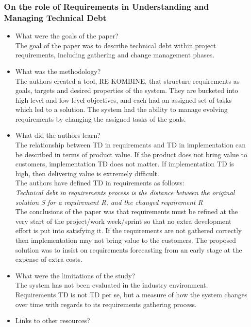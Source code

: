 \documentclass{mprop}
\begin{document}
\subsubsection{On the role of Requirements in Understanding and Managing Technical Debt} \cite{Ernst2012}
\begin{itemize}
	\item What were the goals of the paper? \\
	      The goal of the paper was to describe technical debt within project requirements, including gathering and change management phases.
	\item What was the methodology? \\
	      The authors created a tool, RE-KOMBINE, that structure requirements as goals, targets and desired properties of the system.
	      They are bucketed into high-level and low-level objectives, and each had an assigned set of tasks which led to a solution.
	      The system had the ability to manage evolving requirements by changing the assigned tasks of the goals.
	\item What did the authors learn?\\
	      The relationship between TD in requirements and TD in implementation can be described in terms of product value.
	      If the product does not bring value to customers, implementation TD does not matter.
	      If implementation TD is high, then delivering value is extremely difficult.\\
	      The authors have defined TD in requirements as follows:\\
	      \textit{Technical debt in requirements process is the distance between the original solution S for a requirement R, and the changed requirement R} \\
	      The conclusions of the paper was that requirements must be refined at the very start of the project/work week/sprint so that no extra development effort is put into satisfying it.
	      If the requirements are not gathered correctly then implementation may not bring value to the customers.
	      The proposed solution was to insist on requirements forecasting from an early stage at the expense of extra costs.
	\item What were the limitations of the study?\\
	      The system has not been evaluated in the industry environment.\\
	      Requirements TD is not TD per se, but a measure of how the system changes over time with regards to its requirements gathering process.
	\item Links to other resources? \\
\end{itemize}
\end{document}
